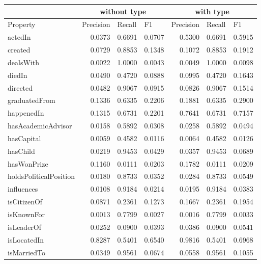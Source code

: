 \begin{table}[htbp]
\centering
\scriptsize
\begin{tabular}{|l|r|r|r|r|r|r|}
\hline
 & \multicolumn{ 3}{c|}{without type} & \multicolumn{ 3}{c|}{with type} \\ \hline
 Property & \multicolumn{1}{l|}{Precision} & \multicolumn{1}{l|}{Recall} & \multicolumn{1}{l|}{F1} & \multicolumn{1}{l|}{Precision} & \multicolumn{1}{l|}{Recall} & \multicolumn{1}{l|}{F1} \\ \hline
 actedIn & 0.0373 & 0.6691 & 0.0707 & 0.5300 & 0.6691 & 0.5915 \\ \hline
 created & 0.0729 & 0.8853 & 0.1348 & 0.1072 & 0.8853 & 0.1912 \\ \hline
 dealsWith & 0.0022 & 1.0000 & 0.0043 & 0.0049 & 1.0000 & 0.0098 \\ \hline
 diedIn & 0.0490 & 0.4720 & 0.0888 & 0.0995 & 0.4720 & 0.1643 \\ \hline
 directed & 0.0482 & 0.9067 & 0.0915 & 0.0826 & 0.9067 & 0.1514 \\ \hline
 graduatedFrom & 0.1336 & 0.6335 & 0.2206 & 0.1881 & 0.6335 & 0.2900 \\ \hline
 happenedIn & 0.1315 & 0.6731 & 0.2201 & 0.7641 & 0.6731 & 0.7157 \\ \hline
 hasAcademicAdvisor & 0.0158 & 0.5892 & 0.0308 & 0.0258 & 0.5892 & 0.0494 \\ \hline
 hasCapital & 0.0059 & 0.4582 & 0.0116 & 0.0064 & 0.4582 & 0.0126 \\ \hline
 hasChild & 0.0219 & 0.9453 & 0.0429 & 0.0357 & 0.9453 & 0.0689 \\ \hline
 hasWonPrize & 0.1160 & 0.0111 & 0.0203 & 0.1782 & 0.0111 & 0.0209 \\ \hline
 holdsPoliticalPosition & 0.0180 & 0.8733 & 0.0352 & 0.0284 & 0.8733 & 0.0549 \\ \hline
 influences & 0.0108 & 0.9184 & 0.0214 & 0.0195 & 0.9184 & 0.0383 \\ \hline
 isCitizenOf & 0.0871 & 0.2361 & 0.1273 & 0.1667 & 0.2361 & 0.1954 \\ \hline
 isKnownFor & 0.0013 & 0.7799 & 0.0027 & 0.0016 & 0.7799 & 0.0033 \\ \hline
 isLeaderOf & 0.0252 & 0.0900 & 0.0393 & 0.0386 & 0.0900 & 0.0541 \\ \hline
 isLocatedIn & 0.8287 & 0.5401 & 0.6540 & 0.9816 & 0.5401 & 0.6968 \\ \hline
 isMarriedTo & 0.0349 & 0.9561 & 0.0674 & 0.0558 & 0.9561 & 0.1055 \\ \hline

\end{tabular}
\end{table}
